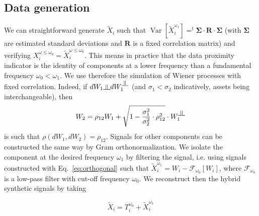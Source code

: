 \documentclass{bmcart}
\DeclareMathOperator{\Var}{Var}
\newcommand{\Varb}[1]{\ensuremath{\Var\!\left[#1\right]}}
\newcommand{\indep}{\rotatebox[origin=c]{90}{$\models$}}
\begin{document}
\subsection*{Data generation}


We can straightforward generate $\tilde{X}_i$ such that $\Varb{\tilde{X}_i^{\omega_1}}= ^{t}\mathbf{\Sigma} \cdot \mathbf{R} \cdot \mathbf{\Sigma}$ (with $\mathbf{\Sigma}$ are estimated standard deviations and $\mathbf{R}$ is a fixed correlation matrix) and verifying $X_i^{\omega \leq \omega_0} = \tilde{X}_i^{\omega \leq \omega_0}$. This means in practice that the data proximity indicator is the identity of components at a lower frequency than a fundamental frequency $\omega_0 < \omega_1$. We use therefore the simulation of Wiener processes with fixed correlation. Indeed, if $dW_1 \indep dW_1^{\indep}$ (and $\sigma_1 < \sigma_2$ indicatively, assets being interchangeable), then
\begin{equation}
\label{eq:orthogonal}
W_2 = \rho_{12}W_1 + \sqrt{1-\frac{\sigma_1^2}{\sigma_2^2}\cdot\rho_{12}^2}\cdot W_1^{\indep}
\end{equation}
is such that $\rho(dW_1,dW_2)=\rho_{12}$. Signals for other components can be constructed the same way by Gram orthonormalization. We isolate the component at the desired frequency $\omega_1$ by filtering the signal, i.e. using signals constructed with Eq.~\ref{eq:orthogonal} such that $\tilde{X}_i^{\omega_1} = W_i - \mathcal{F}_{\omega_0}[W_i]$, where $\mathcal{F}_{\omega_0}$ is a low-pass filter with cut-off frequency $\omega_0$. We reconstruct then the hybrid synthetic signals by taking
 
\begin{equation}
\tilde{X}_i = T_i^{\omega_0} + \tilde{X}_i^{\omega_1}
\end{equation}
\end{document}
